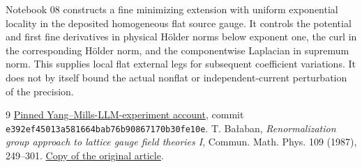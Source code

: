 \documentclass[11pt]{article}
\theoremstyle{remark}
\begin{document}
Notebook 08 constructs a fine minimizing extension with uniform
exponential locality in the deposited homogeneous flat source gauge.
It controls the potential and first fine derivatives in physical
H\"older norms below exponent one, the curl in the corresponding
H\"older norm, and the componentwise Laplacian in supremum norm.
This supplies local flat external legs for subsequent coefficient
variations. It does not by itself bound the actual nonflat or
independent-current perturbation of the precision.

\begin{thebibliography}{9}
 \href{https://github.com/ethanwsussman/Yang--Mills-LLM-experiment/tree/e392ef45013a581664bab76b90867170b30fe10e}
{Pinned Yang--Mills-LLM-experiment account}, commit
\texttt{e392ef45013a581664bab76b90867170b30fe10e}.
 T. Ba\l aban,
\emph{Renormalization group approach to lattice gauge field theories I},
Commun. Math. Phys. 109 (1987), 249--301.
\href{https://scispace.com/pdf/renormalization-group-approach-to-lattice-gauge-field-3ygai0vxt1.pdf}
{Copy of the original article}.
\end{thebibliography}
\end{document}
